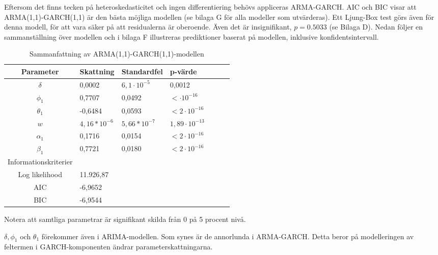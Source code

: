 \documentclass[11pt]{article}
\numberwithin{equation}{section}
\numberwithin{table}{section}
\numberwithin{figure}{section}
\begin{document}
Eftersom det finns tecken på heteroskedasticitet och ingen differentiering behövs appliceras ARMA-GARCH. AIC och BIC visar att ARMA(1,1)-GARCH(1,1) är den bästa möjliga modellen (se bilaga G för alla modeller som utvärderas). Ett Ljung-Box test görs även för denna modell, för att vara säker på att residualerna är oberoende. Även det är insignifikant, $p=0.5033$ (se Bilaga D). Nedan följer en sammanställning över modellen och i bilaga F illustreras prediktioner baserat på modellen, inklusive konfidentsintervall.

\begin{table}[H]
\caption{Sammanfattning av ARMA(1,1)-GARCH(1,1)-modellen}
\begin{tabularx}{\textwidth}{c *{6}{Y}}
\toprule
Parameter  & Skattning & Standardfel & p-värde \\
\hline

$\delta$      & 0,0002         & $6,1\cdot10^{-5}$ & 0,0012           \\
$\phi_1$      & 0,7707         & 0,0492         & $<\cdot10^{-16}$    \\

$\theta_1$    & -0,6484        & 0,0593         & $<2\cdot10^{-16}$    \\
$w$           & $4,16*10^{-6}$ & $5,66*10^{-7}$ & $1,89\cdot10^{-13}$  \\

$\alpha_1$    & 0,1716         & 0,0154         & $<2\cdot10^{-16}$    \\
$\beta_1$     & 0,7721         & 0,0180         & $<2\cdot10^{-16}$    \\ 
\midrule

Informationskriterier  & &  &  \\
\hline

Log likelihood & 11.926,87       &                &                  \\
AIC            & -6,9652        &                &                   \\

BIC            & -6,9544         &                &                   \\
\bottomrule
\end{tabularx}
\footnotesize{Notera att samtliga parametrar är signifikant skilda från 0 på 5 procent nivå.}
\end{table}






$\delta, \phi_1$ och $\theta_1$ förekommer även i ARIMA-modellen. Som synes är de annorlunda i ARMA-GARCH. Detta beror på modelleringen av feltermen i GARCH-komponenten ändrar parameterskattningarna.
\end{document}
